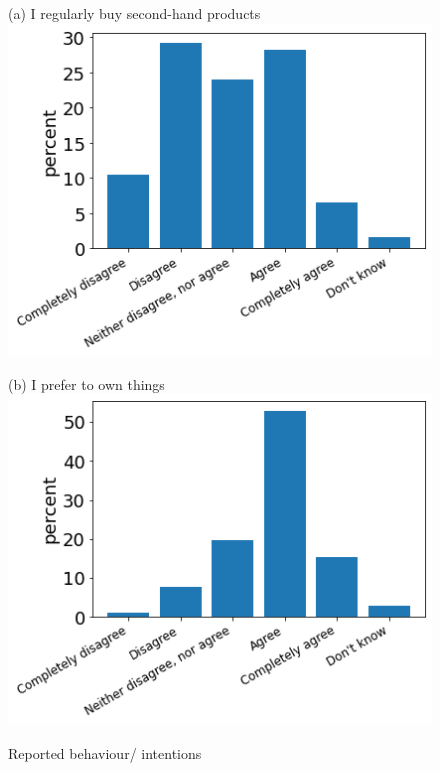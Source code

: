 \documentclass[12pt]{article}
\begin{document}
\begin{figure}[h!!]
	\centering	
	\caption{Reported behaviour/ intentions}\label{fig:behaviour}	
	\begin{minipage}[h!!]{0.32\textwidth}  
		\centering\footnotesize{(a) I regularly buy second-hand products}
		\includegraphics[width=1\textwidth]{../codding_data/results/liss/qk20a135title0.png}
	\end{minipage}
	\begin{minipage}[h!!]{0.32\textwidth}
		\centering\footnotesize{(b) I prefer to own things}
		\includegraphics[width=1\textwidth]{../codding_data/results/liss/qk20a144title0.png}

\end{minipage}
\end{figure}
\end{document}

